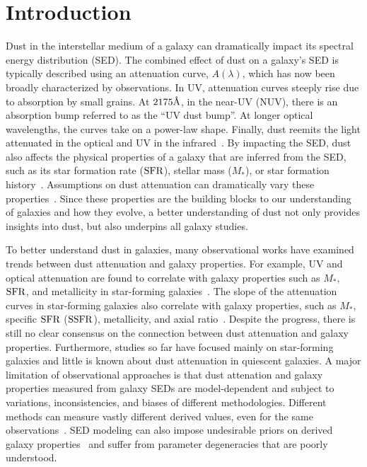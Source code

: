 \section{Introduction} \label{sec:intro} 
Dust in the interstellar medium of a galaxy can dramatically impact its
spectral energy distribution (SED). %
The combined effect of dust on a galaxy's SED is typically described using
an attenuation curve, $A(\lambda)$, which has now been broadly characterized 
by observations. 
In UV, attenuation curves steeply rise due to absorption by small grains.
At $2175\AA$, in the near-UV (NUV), there is an absorption bump referred to as
the ``UV dust bump''. 
At longer optical wavelengths, the curves take on a power-law shape. 
Finally, dust reemits the light attenuated in the optical and UV in the
infrared~\citep[for an overview see][]{calzetti2001, draine2003,
galliano2018}.
By impacting the SED, dust also affects the physical properties of a galaxy
that are inferred from the SED, such as its star formation rate (${\rm SFR}$),
stellar mass ($M_*$), or star formation history~\citep[see reviews by][]{walcher2011,
conroy2013}. 
Assumptions on dust attenuation can dramatically vary these
properties~\citep{kriek2013, reddy2015, salim2016, salim2020}.
Since these properties are the building blocks to our understanding of
galaxies and how they evolve, a better understanding of dust not only provides
insights into dust, but also underpins all galaxy studies.  

To better understand dust in galaxies, many observational works have
examined trends between dust attenuation and galaxy properties.
For example, UV and optical attenuation are found to correlate with galaxy
properties such as $M_*$, ${\rm SFR}$, and metallicity in star-forming
galaxies~\citep[][for a recent review see \citealt{salim2020}]{garn2010, battisti2016}. 
The slope of the attenuation curves in star-forming galaxies also correlate
with galaxy properties, such as $M_*$, specific ${\rm SFR}$ (${\rm SSFR}$), metallicity,
and axial ratio~\citep{wild2011, battisti2017}. 
Despite the progress, there is still no clear consensus on the connection
between dust attenuation and galaxy properties.
Furthermore, studies so far have focused mainly on star-forming galaxies and
little is known about dust attenuation in quiescent galaxies. 
A major limitation of observational approaches is that dust attenation and
galaxy properties measured from galaxy SEDs are model-dependent and subject to
variations, inconsistencies, and biases of different methodologies.
Different methods can measure vastly different derived values, even for the
same observations~\citep[\eg][see also Appendix~\ref{sec:slab}]{speagle2014, katsianis2020}.
SED modeling can also impose undesirable priors on derived galaxy
properties~\citep{carnall2018, leja2019} and suffer from parameter degeneracies
that are poorly understood. 

